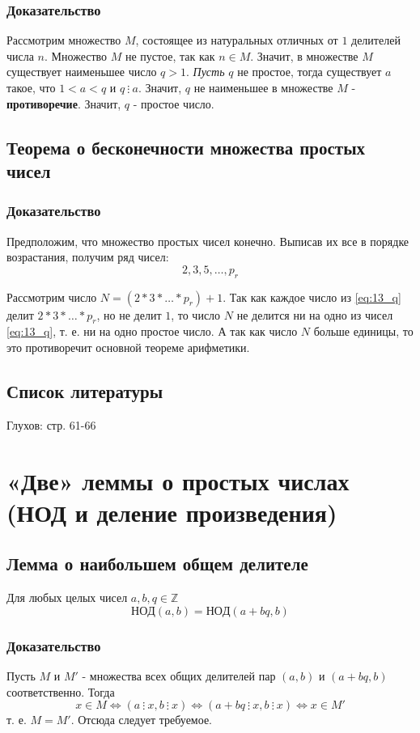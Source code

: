 \documentclass{article}
\newcommand{\cgcd}{\mathrm{НОД}}
\newcommand{\divs}{~\vdots~}
\begin{document}
\subsubsection*{Доказательство}
Рассмотрим множество $M$, состоящее из натуральных отличных от $1$ делителей числа $n$. Множество $M$ не пустое, так как $n \in M$. Значит, в множестве $M$ существует наименьшее число $q > 1$. \textit{Пусть} $q$ не простое, тогда существует $a$ такое, что $1 < a < q$ и $q \divs a$. Значит, $q$ не наименьшее в множестве $M$ - \textbf{противоречие}. Значит, $q$ - простое число.

\subsection{Теорема о бесконечности множества простых чисел}
\subsubsection*{Доказательство}
Предположим, что множество простых чисел конечно. Выписав их все в порядке возрастания, получим ряд чисел:
\begin{equation}
\label{eq:13_q}
2, 3, 5, \dots, p_r
\end{equation}

Рассмотрим число $N = (2 * 3 * \dots * p_r) + 1$. Так как каждое число из \eqref{eq:13_q} делит $2 * 3 * \dots * p_r$, но не делит $1$, то число $N$ не делится ни на одно из чисел \eqref{eq:13_q}, т. е. ни на одно простое число. А так как число $N$ больше единицы, то это противоречит основной теореме арифметики.

\subsection*{Список литературы}
Глухов: стр. 61-66


\newpage
\section{«Две» леммы о простых числах (НОД и деление произведения)}
\subsection{Лемма о наибольшем общем делителе}
Для любых целых чисел $a, b, q \in \mathbb Z$
\[\cgcd(a, b) = \cgcd(a + bq, b)\]

\subsubsection*{Доказательство}
Пусть $M$ и $M'$ - множества всех общих делителей пар $(a, b)$ и $(a + bq, b)$ соответственно. Тогда
\[x \in M \Leftrightarrow (a \divs x, b \divs x) \Leftrightarrow (a + bq \divs x, b \divs x) \Leftrightarrow x \in M'\]
т. е. $M = M'$. Отсюда следует требуемое.
\end{document}
